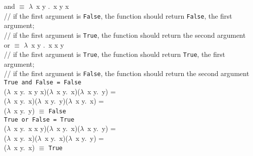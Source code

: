and $\equiv$ $\lambda$~x y .~x y x \\
	\indent\indent // if the first argument is \texttt{False}, the function should return \texttt{False}, \ie the first argument; \\
	\indent\indent // if the first argument is \texttt{True}, the function should return the second argument\\
or $\equiv$ $\lambda$~x y .~x x y \\
	\indent\indent // if the first argument is \texttt{True}, the function should return \texttt{True}, \ie the first argument; \\
	\indent\indent // if the first argument is \texttt{False}, the function should return the second argument\\

\texttt{True and False = False}\\
\indent\indent ($\lambda$~x y.~x y x)($\lambda$~x y.~x)($\lambda$~x y.~y) = \\
\indent\indent ($\lambda$~x y.~x)($\lambda$~x y.~y)($\lambda$~x y.~x) = \\
\indent\indent ($\lambda$~x y.~y) $\equiv$ \texttt{False} \\

\texttt{True or False = True}\\
\indent\indent ($\lambda$~x y.~x x y)($\lambda$~x y.~x)($\lambda$~x y.~y) = \\
\indent\indent ($\lambda$~x y.~x)($\lambda$~x y.~x)($\lambda$~x y.~y) = \\
\indent\indent ($\lambda$~x y.~x) $\equiv$ \texttt{True} \\